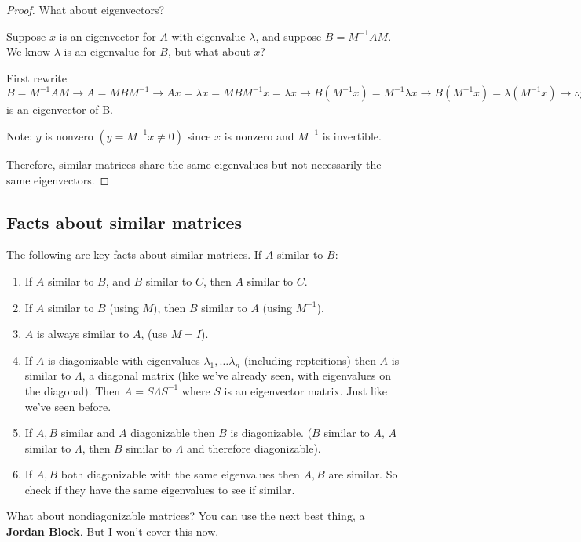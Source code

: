\begin{proof} What about eigenvectors?

Suppose $x$ is an eigenvector for $A$ with eigenvalue $\lambda$, and suppose $B=M^{-1}AM$. We know $\lambda$ is an eigenvalue for $B$, but what about $x$?

First rewrite $B=M^{-1}AM \rightarrow A=MBM^{-1} \rightarrow Ax=\lambda x = MBM^{-1}x = \lambda x \rightarrow B(M^{-1}x)=M^{-1}\lambda x \rightarrow B(M^{-1}x)=\lambda (M^{-1}x) \rightarrow \therefore y=M^{-1}x$ is an eigenvector of B.

Note: $y$ is nonzero $(y =M^{-1}x \neq 0)$ since $x$ is nonzero and $M^{-1}$ is invertible.

Therefore, similar matrices share the same eigenvalues but not necessarily the same eigenvectors.

\end{proof}

\subsection{Facts about similar matrices}

The following are key facts about similar matrices. If $A$ similar to $B$:
\begin{enumerate}
    \item If $A$ similar to $B$, and $B$ similar to $C$, then $A$ similar to $C$.
    \item If $A$ similar to $B$ (using $M$), then $B$ similar to $A$ (using $M^{-1}$).
    \item $A$ is always similar to $A$, (use $M=I$).
    \item If $A$ is diagonizable with eigenvalues $\lambda_1, \dots \lambda_n$ (including repteitions) then $A$ is similar to $\Lambda$, a diagonal matrix (like we've already seen, with eigenvalues on the diagonal). Then $A=S\Lambda S^{-1}$ where $S$ is an eigenvector matrix. Just like we've seen before.
    \item If $A, B$ similar and $A$ diagonizable then $B$ is diagonizable. ($B$ similar to $A$, $A$ similar to $\Lambda$, then $B$ similar to $\Lambda$ and therefore diagonizable).
    \item If $A,B$ both diagonizable with the same eigenvalues then $A, B$ are similar. So check if they have the same eigenvalues to see if similar.
\end{enumerate}

\begin{remark}
What about nondiagonizable matrices? You can use the next best thing, a \textbf{Jordan Block}. But I won't cover this now.
\end{remark}

